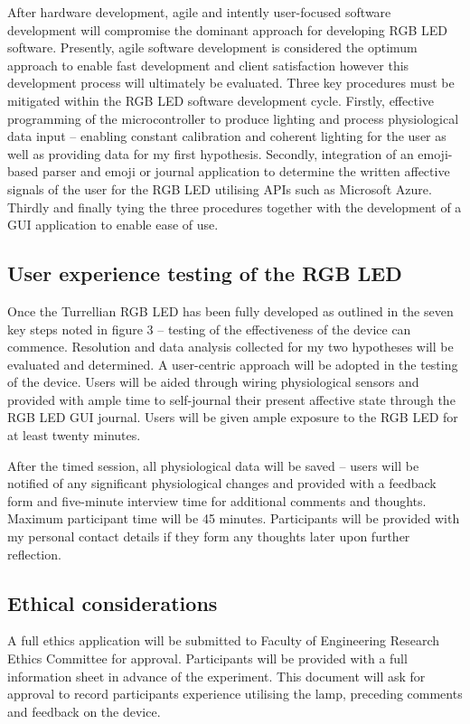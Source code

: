 \documentclass{sigchi}
\begin{document}
After hardware development, agile and intently user-focused software development will compromise the dominant approach for developing RGB LED software. Presently, agile software development is considered the optimum approach to enable fast development and client satisfaction however this development process will ultimately be evaluated. Three key procedures must be mitigated within the RGB LED software development cycle. Firstly, effective programming of the microcontroller to produce lighting and process physiological data input – enabling constant calibration and coherent lighting for the user as well as providing data for my first hypothesis. Secondly, integration of an emoji-based parser and emoji or journal application to determine the written affective signals of the user for the RGB LED utilising APIs such as Microsoft Azure. Thirdly and finally tying the three procedures together with the development of a GUI application to enable ease of use. 

\subsection{User experience testing of the RGB LED}

Once the Turrellian RGB LED has been fully developed as outlined in the seven key steps noted in figure 3 – testing of the effectiveness of the device can commence. Resolution and data analysis collected for my two hypotheses will be evaluated and determined. A user-centric approach will be adopted in the testing of the device. Users will be aided through wiring physiological sensors and provided with ample time to self-journal their present affective state through the RGB LED GUI journal. Users will be given ample exposure to the RGB LED for at least twenty minutes.

After the timed session, all physiological data will be saved – users will be notified of any significant physiological changes and provided with a feedback form and five-minute interview time for additional comments and thoughts. Maximum participant time will be 45 minutes. Participants will be provided with my personal contact details if they form any thoughts later upon further reflection.

\subsection{Ethical considerations}

A full ethics application will be submitted to Faculty of Engineering Research Ethics Committee for approval. Participants will be provided with a full information sheet in advance of the experiment. This document will ask for approval to record participants experience utilising the lamp, preceding comments and feedback on the device. 
\end{document}
